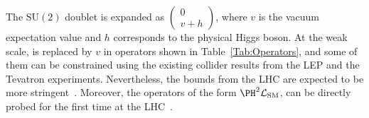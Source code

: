 \documentclass[a4paper,11pt]{article}
\newcommand{\Pb}{{{\Pqb}}\xspace}
\newcommand{\PAb}{{{{\Paqb}}}\xspace}
\renewcommand{\PV}{{{{V}}}\xspace}
\begin{document}


The $\textrm{SU}(2)$ doublet \PH is expanded as $\begin{pmatrix} 0 \\ v+h \end{pmatrix}$, where $v$ is the vacuum expectation value  and $h$ corresponds to the physical Higgs boson.
At the weak scale,  \PH is replaced by $v$ in operators shown in Table~\ref{Tab:Operators}, and some of them can be constrained using the existing collider results from  the LEP and the Tevatron experiments.
Nevertheless, the bounds from the LHC are expected to be more stringent~\cite{Ellis:2014jta,Grojean:2018dqj}.
Moreover, the operators of the form ${\PH}^2\mathcal{L}_{\text{SM}}$, can be directly probed for the first time at the LHC~\cite{Gupta:2014rxa}. 
\end{document}
